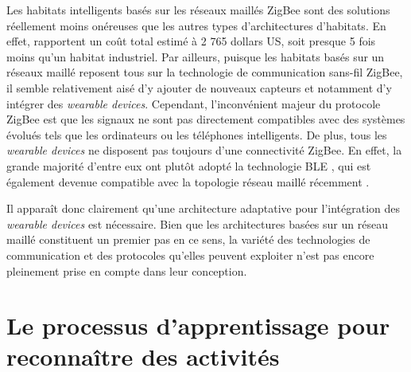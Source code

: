 Les habitats intelligents basés sur les réseaux maillés ZigBee sont des solutions réellement moins onéreuses que les autres types d'architectures d'habitats. En effet, \cite{Cook2013} rapportent un coût total estimé à 2 765 dollars US, soit presque 5 fois moins qu'un habitat industriel. Par ailleurs, puisque les habitats basés sur un réseaux maillé reposent tous sur la technologie de communication sans-fil ZigBee, il semble relativement aisé d'y ajouter de nouveaux capteurs et notamment d'y intégrer des \textit{wearable devices}. Cependant, l'inconvénient majeur du protocole ZigBee est que les signaux ne sont pas directement compatibles avec des systèmes évolués tels que les ordinateurs ou les téléphones intelligents. De plus, tous les \textit{wearable devices} ne disposent pas toujours d'une connectivité ZigBee. En effet, la grande majorité d'entre eux ont plutôt adopté la technologie \ac{BLE} \citep{Martin2014}, qui est également devenue compatible avec la topologie réseau maillé récemment \citep{Bluetooth2017}.

Il apparaît donc clairement qu'une architecture adaptative pour l'intégration des \textit{wearable devices} est nécessaire. Bien que les architectures basées sur un réseau maillé constituent un premier pas en ce sens, la variété des technologies de communication et des protocoles qu'elles peuvent exploiter n'est pas encore pleinement prise en compte dans leur conception. 

\section{Le processus d'apprentissage pour reconnaître des activités}

